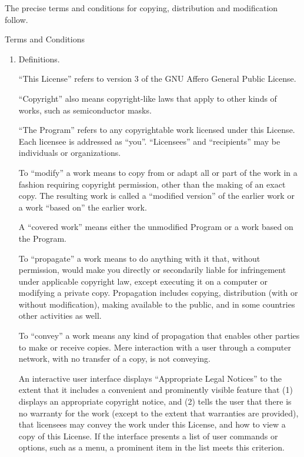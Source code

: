 \documentclass{article}%
\begin{document}
\begin{flushleft}
The precise terms and conditions for copying, distribution and
modification follow.

\begin{center}
{\Large Terms and Conditions}
\end{center}

\begin{enumerate}

\addtocounter{enumi}{-1}

\item Definitions.

``This License'' refers to version 3 of the GNU Affero General Public License.

``Copyright'' also means copyright-like laws that apply to other kinds of
works, such as semiconductor masks.

``The Program'' refers to any copyrightable work licensed under this
License. Each licensee is addressed as ``you''. ``Licensees'' and
``recipients'' may be individuals or organizations.

To ``modify'' a work means to copy from or adapt all or part of the work
in a fashion requiring copyright permission, other than the making of an
exact copy.  The resulting work is called a ``modified version'' of the
earlier work or a work ``based on'' the earlier work.

A ``covered work'' means either the unmodified Program or a work based
on the Program.

To ``propagate'' a work means to do anything with it that, without
permission, would make you directly or secondarily liable for
infringement under applicable copyright law, except executing it on a
computer or modifying a private copy.  Propagation includes copying,
distribution (with or without modification), making available to the
public, and in some countries other activities as well.

To ``convey'' a work means any kind of propagation that enables other
parties to make or receive copies. Mere interaction with a user through
a computer network, with no transfer of a copy, is not conveying.

An interactive user interface displays ``Appropriate Legal Notices''
to the extent that it includes a convenient and prominently visible
feature that (1) displays an appropriate copyright notice, and (2)
tells the user that there is no warranty for the work (except to the
extent that warranties are provided), that licensees may convey the
work under this License, and how to view a copy of this License. If
the interface presents a list of user commands or options, such as a
menu, a prominent item in the list meets this criterion.


\end{enumerate}
\end{flushleft}
\end{document}
